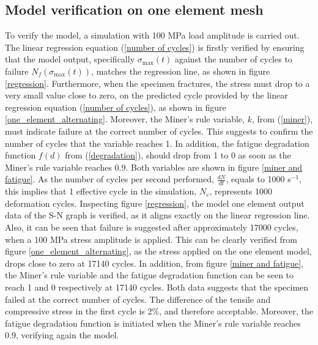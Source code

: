 \documentclass[11pt,a4paper]{article}
\begin{document}
\subsection{Model verification on one element mesh}
To verify the model, a simulation with 100 MPa load amplitude is carried out. The linear regression equation (\ref{number of cycles}) is firstly verified by ensuring that the model output, specifically $\sigma_{\textrm{max}}(t)$ against the number of cycles to failure $N_f(\sigma_{\textrm{max}}(t))$, matches the regression line, as shown in figure \ref{regression}. Furthermore, when the specimen fractures, the stress must drop to a very small value close to zero, on the predicted cycle provided by the linear regression equation (\ref{number of cycles}), as shown in figure \ref{one_element_alternating}. Moreover, the Miner's rule variable, $k$, from (\ref{miner}), must indicate failure at the correct number of cycles. This suggests to confirm the number of cycles that the variable reaches 1. In addition, the fatigue degradation function $f(d)$ from (\ref{degradation}), should drop from 1 to 0 as soon as the Miner's rule variable reaches 0.9. Both variables are shown in figure \ref{miner and fatigue}. As the number of cycles per second performed, $\frac{dN}{dt}$, equals to 1000 s$^{-1}$, this implies that 1 effective cycle in the simulation, $N_e$, represents 1000 deformation cycles. Inspecting figure \ref{regression}, the model one element output data of the S-N graph is verified, as it aligns exactly on the linear regression line. Also, it can be seen that failure is suggested after approximately 17000 cycles, when a 100 MPa stress amplitude is applied. This can be clearly verified from figure \ref{one_element_alternating}, as the stress applied on the one element model, drops close to zero at 17140 cycles. In addition, from figure \ref{miner and fatigue}, the Miner's rule variable and the fatigue degradation function can be seen to reach 1 and 0 respectively at 17140 cycles. Both data suggests that the specimen failed at the correct number of cycles. The difference of the tensile and compressive stress in the first cycle is 2\%, and therefore acceptable. Moreover, the fatigue degradation function is initiated when the Miner's rule variable reaches 0.9, verifying again the model.
\end{document}
